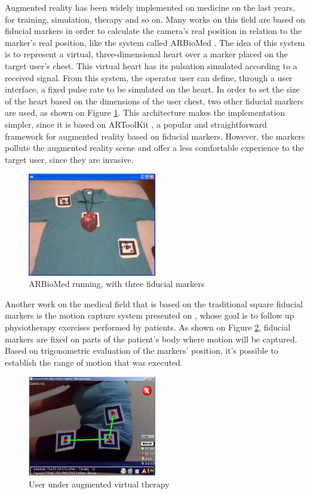 \documentclass[msc, a4paper, classic, en]{ufbathesis}
\begin{document}
Augmented reality has been widely implemented on medicine on the last years, for training, simulation, therapy and so on. Many works on this field are based on fiducial markers in order to calculate the camera's real position in relation to the marker's real position, like the system called ARBioMed \cite{arbiomed}. The idea of this system is to represent a virtual, three-dimensional heart over a marker placed on the target user's chest. This virtual heart has its pulsation simulated according to a received signal. From this system, the operator user can define, through a user interface, a fixed pulse rate to be simulated on the heart. In order to set the size of the heart based on the dimensions of the user chest, two other fiducial markers are used, as shown on Figure \ref{fig:arbiomed}. This architecture makes the implementation simpler, since it is based on ARToolKit \cite{artoolkit}, a popular and straightforward framework for augmented reality based on fiducial markers. However, the markers pollute the augmented reality scene and offer a less comfortable experience to the target user, since they are invasive.

\begin{figure}
\centering
\includegraphics[width=0.5\textwidth]{images/arbiomed.png}
\caption{ARBioMed running, with three fiducial markers \cite{arbiomed}}
\label{fig:arbiomed}
\end{figure}

Another work on the medical field that is based on the traditional square fiducial markers is the motion capture system presented on \cite{fisio}, whose goal is to follow up physiotherapy exercises performed by patients. As shown on Figure \ref{fig:fisio}, fiducial markers are fixed on parts of the patient's body where motion will be captured. Based on trigonometric evaluation of the markers' position, it's possible to establish the range of motion that was executed.

\begin{figure}
\centering
\includegraphics[width=0.5\textwidth]{images/fisio.png}
\caption{User under augmented virtual therapy \cite{fisio}}
\label{fig:fisio}
\end{figure}
\end{document}
